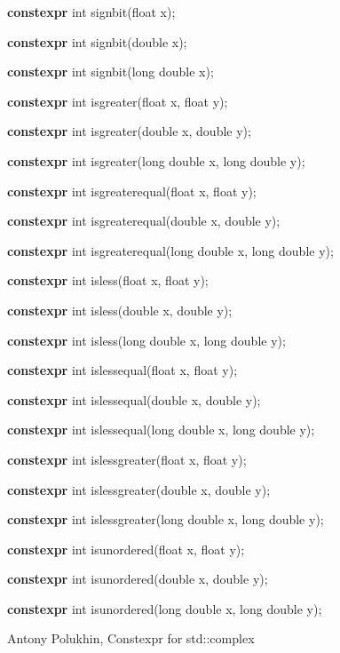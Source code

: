 \documentclass[prd,preprint,amsmath,amssymb,nofootinbib,eqsecnum]{revtex4-1}
\newcommand{\highlight}[1]{{\bf #1}}
\begin{document}
{\highlight{constexpr} int signbit(float x);

\highlight{constexpr} int signbit(double x);

\highlight{constexpr} int signbit(long double x);

\vspace{2ex}

\highlight{constexpr} int isgreater(float x, float y);

\highlight{constexpr} int isgreater(double x, double y);

\highlight{constexpr} int isgreater(long double x, long double y);

\vspace{2ex}

\highlight{constexpr} int isgreaterequal(float x, float y);

\highlight{constexpr} int isgreaterequal(double x, double y);

\highlight{constexpr} int isgreaterequal(long double x, long double y);

\vspace{2ex}

\highlight{constexpr} int isless(float x, float y);

\highlight{constexpr} int isless(double x, double y);

\highlight{constexpr} int isless(long double x, long double y);

\vspace{2ex}

\highlight{constexpr} int islessequal(float x, float y);

\highlight{constexpr} int islessequal(double x, double y);

\highlight{constexpr} int islessequal(long double x, long double y);

\vspace{2ex}

\highlight{constexpr} int islessgreater(float x, float y);

\highlight{constexpr} int islessgreater(double x, double y);

\highlight{constexpr} int islessgreater(long double x, long double y);

\vspace{2ex}

\highlight{constexpr} int isunordered(float x, float y);

\highlight{constexpr} int isunordered(double x, double y);

\highlight{constexpr} int isunordered(long double x, long double y);

}


\begin{thebibliography}{1}
	 Antony Polukhin, Constexpr for std::complex
\end{thebibliography}
\end{document}
